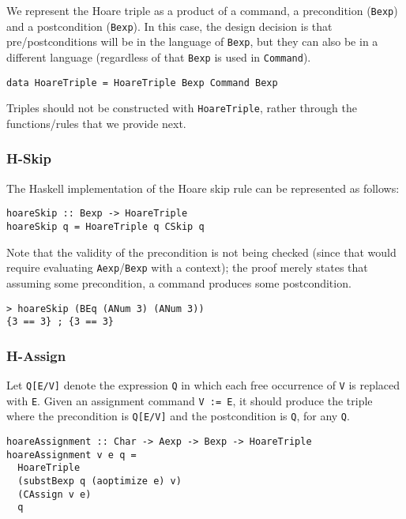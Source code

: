 \documentclass{article}
\begin{document}
We represent the Hoare triple as a product of a command, a precondition (\texttt{Bexp}) and a postcondition (\texttt{Bexp}). In this case, the design decision is that pre/postconditions will be in the language of \texttt{Bexp}, but they can also be in a different language (regardless of that \texttt{Bexp} is used in \texttt{Command}).

\begin{lstlisting}
data HoareTriple = HoareTriple Bexp Command Bexp
\end{lstlisting}

Triples should not be constructed with \texttt{HoareTriple}, rather through the functions/rules that we provide next.

\subsubsection{H-Skip}

The Haskell implementation of the Hoare skip rule can be represented as follows:

\begin{lstlisting}
hoareSkip :: Bexp -> HoareTriple
hoareSkip q = HoareTriple q CSkip q
\end{lstlisting}

Note that the validity of the precondition is not being checked (since that would require evaluating \texttt{Aexp}/\texttt{Bexp} with a context); the proof merely states that assuming some precondition, a command produces some postcondition.

\begin{lstlisting}
> hoareSkip (BEq (ANum 3) (ANum 3))
{3 == 3} ; {3 == 3}
\end{lstlisting}

\subsubsection{H-Assign}

Let \texttt{Q[E/V]} denote the expression \texttt{Q} in which each free occurrence of \texttt{V} is replaced with \texttt{E}. Given an assignment command \texttt{V := E}, it should produce the triple where the precondition is \texttt{Q[E/V]} and the postcondition is \texttt{Q}, for any \texttt{Q}.

\begin{lstlisting}
hoareAssignment :: Char -> Aexp -> Bexp -> HoareTriple
hoareAssignment v e q =
  HoareTriple
  (substBexp q (aoptimize e) v)
  (CAssign v e)
  q
\end{lstlisting}
\end{document}
